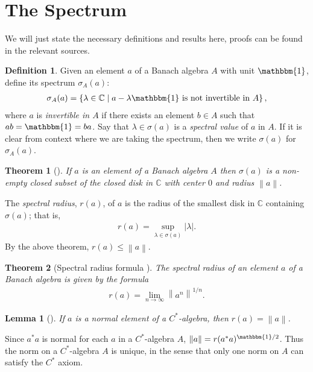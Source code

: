 \documentclass[11pt,a4paper]{report}
\theoremstyle{plain}
\newtheorem*{thm*}{Theorem}
\newtheorem{lemma}{Lemma}
\theoremstyle{definition}
\newtheorem{defn}{Definition}
\newcommand{\1}{\mathbbm{1}}
\newcommand{\C}{\mathbb{C}}
\newcommand{\spec}[1]{\sigma(#1)}
\begin{document}
\section{The Spectrum}
We will just state the necessary definitions and results here, proofs can be 
found in the relevant sources.

\begin{defn}
	Given an element $a$ of a Banach algebra $A$ with unit $\1$, define its 
	spectrum $\sigma_A(a)$:
	\begin{align*}
		\sigma_A(a)=\left\{\lambda\in \C \mid a-\lambda\1 
								\mbox{ is not invertible in }A\right\},
	\end{align*}
	where $a$ is \emph{invertible in $A$} if there exists an element $b\in A$ such 
	that $ab=\1=ba$. Say that $\lambda\in\spec a$ is a \emph{spectral value} of $a$ 
	in $A$. If it is clear from context where we are taking the spectrum, then we 
	write $\spec{a}$ for $\sigma_A(a)$. 
\end{defn}

\begin{thm*}[{\cite[3.2.3]{kadison83}}]
	If $a$ is an element of a Banach algebra $A$ then $\spec a$ is a non-empty 
	closed subset of the closed disk in $\C$ with center $0$ and radius 
	$\left\|a\right\|$.
\end{thm*}

The \emph{spectral radius}, $r(a)$, of $a$ is the radius of the smallest disk in 
$\C$ containing $\spec a$; that is, 
\begin{align*}
	r(a)=\sup_{\lambda\in\spec a}{|\lambda|}.
\end{align*}
By the above theorem, $r(a)\leq\left\|a\right\|$. 

\begin{thm*}[Spectral radius formula {\cite[3.3.3]{kadison83}}]
	The spectral radius of an element $a$ of a Banach algebra is given by the formula
	\begin{align*}
		r(a)= \lim_{n\to\infty} \left\|a^n\right\|^{1/n}.
	\end{align*}
\end{thm*}

\begin{lemma}[{\cite[4.1.1(i)]{kadison83}}]\label{lemma:411}
	If $a$ is a normal element of a $C^\ast$-algebra, then $r(a)=\left\|a\right\|$.
\end{lemma}

Since $a^\ast a$ is normal for each $a$ in a $C^\ast$-algebra $A$, 
$\left\|a\right\| = r(a^\ast a)^{\1/2}$. Thus the norm on a $C^\ast$-algebra $A$ 
is unique, in the sense that only one norm on $A$ can satisfy the $C^\ast$ 
axiom. \cite[II.1.6.5]{blackadar06} 
\end{document}
